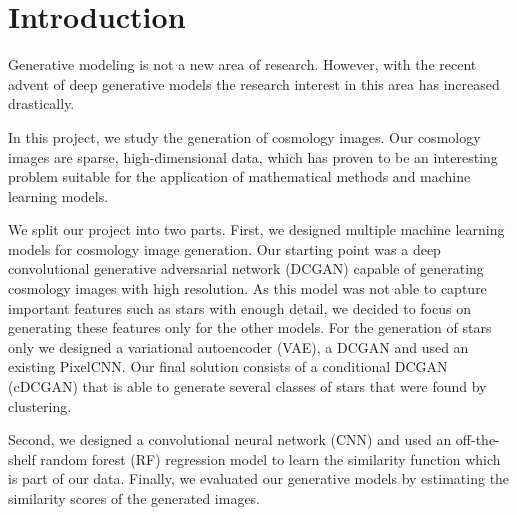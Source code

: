 \documentclass[10pt,conference,compsocconf]{IEEEtran}
\newcommand\TODO[1]{\textcolor{red}{#1}} %
\begin{document}
\section{Introduction}
\label{sec:introduction}
Generative modeling is not a new area of research. However, with the recent advent of deep generative models the research interest in this area has increased drastically. 

In this project, we study the generation of cosmology images. Our cosmology images are sparse, high-dimensional data, which has proven to be an interesting problem suitable for the application of mathematical methods and machine learning models.

We split our project into two parts. First, we designed multiple machine learning models for cosmology image generation. Our starting point was a deep convolutional generative adversarial network (DCGAN) capable of generating cosmology images with high resolution. As this model was not able to capture important features such as stars with enough detail, we decided to focus on generating these features only for the other models. For the generation of stars only we designed a variational autoencoder (VAE), a DCGAN and used an existing PixelCNN. Our final solution consists of a conditional DCGAN (cDCGAN) that is able to generate several classes of stars that were found by clustering.

Second, we designed a convolutional neural network (CNN) and used an off-the-shelf random forest (RF) regression model to learn the similarity function which is part of our data. Finally, we evaluated our generative models by estimating the similarity scores of the generated images. 



\end{document}
